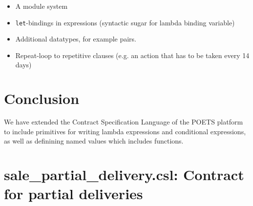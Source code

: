 \documentclass[10pt,a4paper,final,oneside,openany,article]{memoir}
\begin{document}
\begin{itemize}
\item A module system
\item \lstinline{let}-bindings in expressions (syntactic sugar for
  lambda binding variable)
\item Additional datatypes, for example pairs.
\item Repeat-loop to repetitive clauses (e.g. an action that has to be
  taken every 14 days)
\end{itemize}

\chapter{Conclusion}
We have extended the Contract Specification Language of the POETS
platform to include primitives for writing lambda expressions and
conditional expressions, as well as definining named values which
includes functions. 

\printbibliography


\newpage
\appendix
\chapter{sale\_partial\_delivery.csl: Contract for partial deliveries}
\label{chap:sale_partial_delivery}




\end{document}

